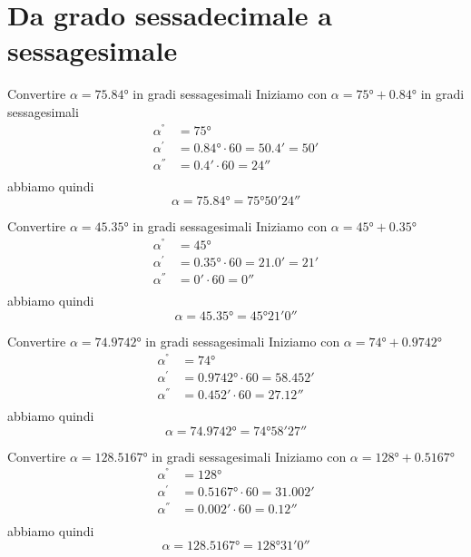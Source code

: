 \section{Da grado sessadecimale a sessagesimale}
\begin{exercise}
	Convertire $\alpha=\ang{75.84}$ in gradi sessagesimali
	\tcblower
	Iniziamo con
	$\alpha=\ang{75}+\ang{0.84}$ in gradi sessagesimali
	\begin{align*}
	\alpha^{\si{\degree}}&=\ang{75}\\ 
	\alpha^{\si{\arcminute}}&=\ang{0.84}\cdot 60=\ang{;50.4;}=\ang{;50;}\\
	\alpha^{\si{\arcsecond}}&=\ang{;0.4;}\cdot 60=\ang{;;24}\\
	\end{align*}
	abbiamo quindi
	\[\alpha=\ang{75.84}=\ang{75;50;24}\]
\end{exercise}
\begin{exercise}
Convertire $\alpha=\ang{45.35}$ in gradi sessagesimali
	\tcblower
Iniziamo con 
$\alpha=\ang{45}+\ang{0.35}$
\begin{align*}
\alpha^{\si{\degree}}&=\ang{45}\\ 
\alpha^{\si{\arcminute}}&=\ang{0.35}\cdot 60=\ang{;21.0;}=\ang{;21;}\\
\alpha^{\si{\arcsecond}}&=\ang{;0;}\cdot 60=\ang{;;0}\\
\end{align*}
abbiamo quindi
\[\alpha=\ang{45.35}=\ang{45;21;0}\]
\end{exercise}
\begin{exercise}
	Convertire $\alpha=\ang{74.9742}$ in gradi sessagesimali
	\tcblower
	Iniziamo con 
	$\alpha=\ang{74}+\ang{0.9742}$
	\begin{align*}
	\alpha^{\si{\degree}}&=\ang{74}\\ 
	\alpha^{\si{\arcminute}}&=\ang{0.9742}\cdot 60=\ang{;58.452;}\\
	\alpha^{\si{\arcsecond}}&=\ang{;0.452;}\cdot 60=\ang{;;27.12}\\
	\end{align*}
	abbiamo quindi
	\[\alpha=\ang{74.9742}=\ang{74;58;27}\]
\end{exercise}
\begin{exercise}
	Convertire $\alpha=\ang{128.5167}$ in gradi sessagesimali
	\tcblower
	Iniziamo con 
	$\alpha=\ang{128}+\ang{0.5167}$
	\begin{align*}
	\alpha^{\si{\degree}}&=\ang{128}\\ 
	\alpha^{\si{\arcminute}}&=\ang{0.5167}\cdot 60=\ang{;31.002;}\\
	\alpha^{\si{\arcsecond}}&=\ang{;0.002;}\cdot 60=\ang{;;0.12}\\
	\end{align*}
	abbiamo quindi
	\[\alpha=\ang{128.5167}=\ang{128;31;0}\]
\end{exercise}

